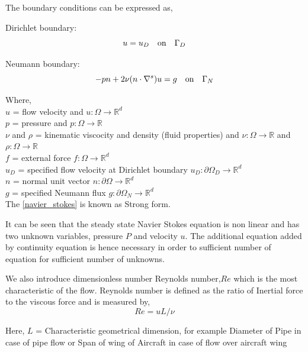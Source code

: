 \documentclass[a4paper,10pt]{book}
\begin{document}
The boundary conditions can be expressed as,

Dirichlet boundary:
\begin{equation}\label{dirichlet_ns}
u=u_D \quad \textnormal{on} \quad \Gamma_D
\end{equation}

Neumann boundary:
\begin{equation} \label{neumann_ns}
-pn + 2\nu(n \cdot \nabla^s)u = g \quad   \textnormal{on}  \quad \Gamma_N
\end{equation}

Where,\\
$u$ = flow velocity and $u:\Omega \rightarrow \mathbb{R}^d$ \\
$p$ = pressure and $p:\Omega \rightarrow \mathbb{R}$\\
$\nu$ and $\rho$ = kinematic viscocity and density (fluid properties) and $\nu:\Omega \rightarrow \mathbb{R}$ and $\rho:\Omega \rightarrow \mathbb{R}$\\
$f$ = external force $f:\Omega \rightarrow \mathbb{R}^d$\\
$u_D$ = specified flow velocity at Dirichlet boundary $u_D:\partial \Omega_D \rightarrow \mathbb{R}^d$\\
$n$ = normal unit vector $n:\partial \Omega \rightarrow \mathbb{R}^d$\\
$g$ = specified Neumann flux $g:\partial \Omega_{N} \rightarrow \mathbb{R}^d$\\

The \eqref{navier_stokes} is known as Strong form.

It can be seen that the steady state Navier Stokes equation is non linear and has two unknown variables, pressure $P$  and velocity $u$. The additional equation added by continuity equation is hence necessary in order to sufficient number of equation for sufficient number of unknowns.

We also introduce dimensionless number Reynolds number,$Re$ which is the most characteristic of the flow. Reynolds number is defined as the ratio of Inertial force to the viscous force and is measured by,
\begin{equation} \label{reynolds_number}
Re =  u L / \nu
\end{equation}

Here, $L$ = Characteristic geometrical dimension, for example Diameter of Pipe in case of pipe flow or Span of wing of Aircraft in case of flow over aircraft wing\\
\end{document}
